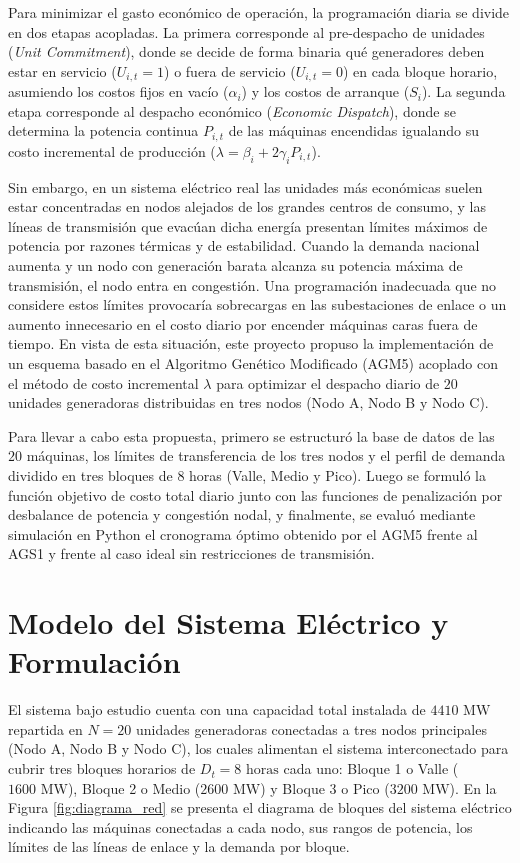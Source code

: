 \documentclass[11pt,letterpaper]{article}
\begin{document}
Para minimizar el gasto económico de operación, la programación diaria se divide en dos etapas acopladas. La primera corresponde al pre-despacho de unidades (\textit{Unit Commitment}), donde se decide de forma binaria qué generadores deben estar en servicio ($U_{i,t} = 1$) o fuera de servicio ($U_{i,t} = 0$) en cada bloque horario, asumiendo los costos fijos en vacío ($\alpha_i$) y los costos de arranque ($S_i$). La segunda etapa corresponde al despacho económico (\textit{Economic Dispatch}), donde se determina la potencia continua $P_{i,t}$ de las máquinas encendidas igualando su costo incremental de producción ($\lambda = \beta_i + 2\gamma_i P_{i,t}$).

Sin embargo, en un sistema eléctrico real las unidades más económicas suelen estar concentradas en nodos alejados de los grandes centros de consumo, y las líneas de transmisión que evacúan dicha energía presentan límites máximos de potencia por razones térmicas y de estabilidad. Cuando la demanda nacional aumenta y un nodo con generación barata alcanza su potencia máxima de transmisión, el nodo entra en congestión. Una programación inadecuada que no considere estos límites provocaría sobrecargas en las subestaciones de enlace o un aumento innecesario en el costo diario por encender máquinas caras fuera de tiempo. En vista de esta situación, este proyecto propuso la implementación de un esquema basado en el Algoritmo Genético Modificado (AGM5) acoplado con el método de costo incremental $\lambda$ para optimizar el despacho diario de $20$ unidades generadoras distribuidas en tres nodos (Nodo A, Nodo B y Nodo C).

Para llevar a cabo esta propuesta, primero se estructuró la base de datos de las $20$ máquinas, los límites de transferencia de los tres nodos y el perfil de demanda dividido en tres bloques de $8$ horas (Valle, Medio y Pico). Luego se formuló la función objetivo de costo total diario junto con las funciones de penalización por desbalance de potencia y congestión nodal, y finalmente, se evaluó mediante simulación en Python el cronograma óptimo obtenido por el AGM5 frente al AGS1 y frente al caso ideal sin restricciones de transmisión.

\section{Modelo del Sistema Eléctrico y Formulación}

El sistema bajo estudio cuenta con una capacidad total instalada de $4410\text{ MW}$ repartida en $N = 20$ unidades generadoras conectadas a tres nodos principales (Nodo A, Nodo B y Nodo C), los cuales alimentan el sistema interconectado para cubrir tres bloques horarios de $D_t = 8\text{ horas}$ cada uno: Bloque 1 o Valle ($1600\text{ MW}$), Bloque 2 o Medio ($2600\text{ MW}$) y Bloque 3 o Pico ($3200\text{ MW}$). En la Figura \ref{fig:diagrama_red} se presenta el diagrama de bloques del sistema eléctrico indicando las máquinas conectadas a cada nodo, sus rangos de potencia, los límites de las líneas de enlace y la demanda por bloque.
\end{document}
